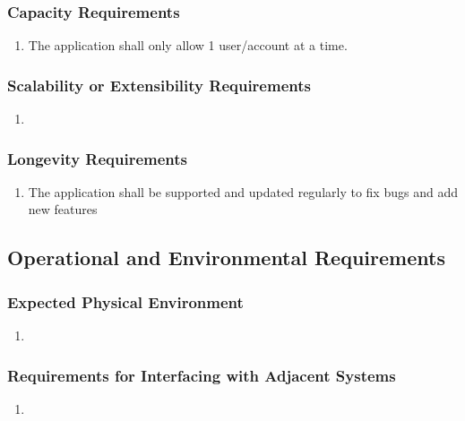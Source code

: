 \documentclass[]{article}
\begin{document}
\subsubsection{Capacity Requirements}
\label{ssub:capacity_requirements}
\begin{enumerate}[{PR}1. ]
	\item The application shall only allow 1 user/account at a time.
\end{enumerate}

\subsubsection{Scalability or Extensibility Requirements}
\label{ssub:scalability_or_extensibility_requirements}
\begin{enumerate}[{PR}1. ]
	\item
\end{enumerate}

\subsubsection{Longevity Requirements}
\label{ssub:longevity_requirements}
\begin{enumerate}[{PR}1. ]
	\item The application shall be supported and updated regularly to fix bugs and 
add new features
\end{enumerate}


\subsection{Operational and Environmental Requirements}
\label{sub:operational_and_environmental_requirements}

\subsubsection{Expected Physical Environment}
\label{ssub:expected_physical_environment}
\begin{enumerate}[{OE}1. ]
	\item
\end{enumerate}

\subsubsection{Requirements for Interfacing with Adjacent Systems}
\label{ssub:requirements_for_interfacing_with_adjacent_systems}
\begin{enumerate}[{OE}1. ]
	\item
\end{enumerate}
\end{document}
